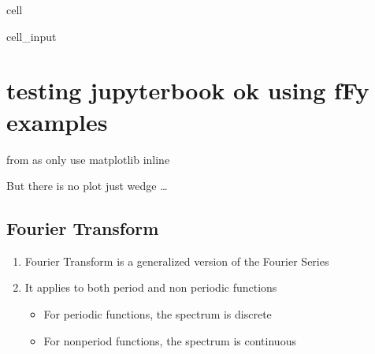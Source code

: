 \documentclass[letterpaper,10pt,english]{jupyterBook}
\begin{document}
\begin{sphinxuseclass}{cell}
\begin{sphinxVerbatimInput}
\begin{sphinxuseclass}{cell_input}
\begin{sphinxVerbatim}[commandchars=\\\{\}]
       
           
       
          \PYG{p}{[}\PYG{p}{]}

     
\end{sphinxVerbatim}

\end{sphinxuseclass}\end{sphinxVerbatimInput}

\end{sphinxuseclass}
\sphinxstepscope


\chapter{testing jupyter\sphinxhyphen{}book ok using fFy examples}
\label{\detokenize{fFy:testing-jupyter-book-ok-using-ffy-examples}}\label{\detokenize{fFy::doc}}
\sphinxAtStartPar
from 
as only use matplotlib inline

\sphinxAtStartPar
But there is no plot just wedge …


\section{Fourier Transform}
\label{\detokenize{fFy:fourier-transform}}\begin{enumerate}
%
\item {} 
\sphinxAtStartPar
Fourier Transform is a generalized version of the Fourier Series

\item {} 
\sphinxAtStartPar
It applies to both period and non periodic functions
\begin{itemize}
\item {} 
\sphinxAtStartPar
For periodic functions, the spectrum is discrete

\item {} 
\sphinxAtStartPar
For non\sphinxhyphen{}period functions, the spectrum is continuous

\end{itemize}

\end{enumerate}
\end{document}
